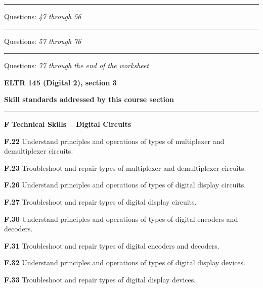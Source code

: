 \vskip 10pt
\hrule \vskip 5pt
\noindent
{}

\hskip 10pt Questions: {\it 47 through 56}
 
\vskip 10pt
\hrule \vskip 5pt
\noindent
{}

\hskip 10pt Questions: {\it 57 through 76}
 
\vskip 10pt
\hrule \vskip 5pt
\noindent
{}

\hskip 10pt Questions: {\it 77 through the end of the worksheet}
 











\vfil \eject

\centerline{\bf ELTR 145 (Digital 2), section 3} \bigskip 
 
\vskip 10pt

\noindent
{\bf Skill standards addressed by this course section}

\vskip 5pt

\hrule \vskip 10pt
\noindent
{}

\vskip 5pt

\medskip
\item{\bf F} {\bf Technical Skills -- Digital Circuits}
\item{\bf F.22} Understand principles and operations of types of multiplexer and demultiplexer circuits.
\item{\bf F.23} Troubleshoot and repair types of multiplexer and demultiplexer circuits.
\item{\bf F.26} Understand principles and operations of types of digital display circuits.
\item{\bf F.27} Troubleshoot and repair types of digital display circuits.
\item{\bf F.30} Understand principles and operations of types of digital encoders and decoders.
\item{\bf F.31} Troubleshoot and repair types of digital encoders and decoders.
\item{\bf F.32} Understand principles and operations of types of digital display devices.
\item{\bf F.33} Troubleshoot and repair types of digital display devices.
\medskip

